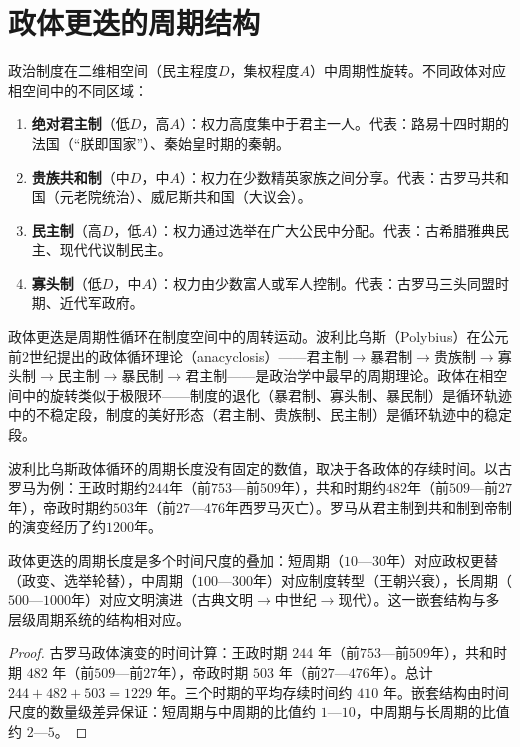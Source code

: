 \section{政体更迭的周期结构}

\begin{definition}[政体更迭的相位空间]\label{def:regime_change}
政治制度在二维相空间（民主程度$D$，集权程度$A$）中周期性旋转。不同政体对应相空间中的不同区域：
\begin{enumerate}[label=(\roman*)]
    \item \textbf{绝对君主制}（低$D$，高$A$）：权力高度集中于君主一人。代表：路易十四时期的法国（“朕即国家”）、秦始皇时期的秦朝。
    \item \textbf{贵族共和制}（中$D$，中$A$）：权力在少数精英家族之间分享。代表：古罗马共和国（元老院统治）、威尼斯共和国（大议会）。
    \item \textbf{民主制}（高$D$，低$A$）：权力通过选举在广大公民中分配。代表：古希腊雅典民主、现代代议制民主。
    \item \textbf{寡头制}（低$D$，中$A$）：权力由少数富人或军人控制。代表：古罗马三头同盟时期、近代军政府。
\end{enumerate}
政体更迭是周期性循环在制度空间中的周转运动。波利比乌斯（Polybius）在公元前$2$世纪提出的政体循环理论（anacyclosis）——君主制$\to$暴君制$\to$贵族制$\to$寡头制$\to$民主制$\to$暴民制$\to$君主制——是政治学中最早的周期理论。政体在相空间中的旋转类似于极限环——制度的退化（暴君制、寡头制、暴民制）是循环轨迹中的不稳定段，制度的美好形态（君主制、贵族制、民主制）是循环轨迹中的稳定段。
\end{definition}

\begin{proposition}[政体更迭的周期长度]\label{prop:regime_cycle_length}
波利比乌斯政体循环的周期长度没有固定的数值，取决于各政体的存续时间。以古罗马为例：王政时期约$244$年（前$753$—前$509$年），共和时期约$482$年（前$509$—前$27$年），帝政时期约$503$年（前$27$—$476$年西罗马灭亡）。罗马从君主制到共和制到帝制的演变经历了约$1200$年。

政体更迭的周期长度是多个时间尺度的叠加：短周期（$10$—$30$年）对应政权更替（政变、选举轮替），中周期（$100$—$300$年）对应制度转型（王朝兴衰），长周期（$500$—$1000$年）对应文明演进（古典文明$\to$中世纪$\to$现代）。这一嵌套结构与多层级周期系统的结构相对应。
\end{proposition}

\begin{proof}
古罗马政体演变的时间计算：王政时期 $244$ 年（前$753$—前$509$年），共和时期 $482$ 年（前$509$—前$27$年），帝政时期 $503$ 年（前$27$—$476$年）。总计 $244+482+503=1229$ 年。三个时期的平均存续时间约 $410$ 年。嵌套结构由时间尺度的数量级差异保证：短周期与中周期的比值约 $1$—$10$，中周期与长周期的比值约 $2$—$5$。
\end{proof}

